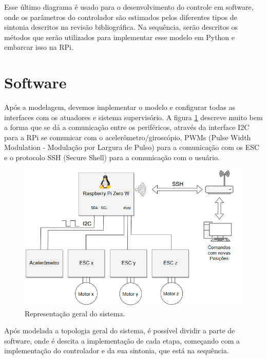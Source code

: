 Esse último diagrama é usado para o desenvolvimento do controle em software, onde os parâmetros do controlador são estimados pelos diferentes tipos de sintonia descritos na revisão bibliográfica. Na sequência, serão descritos os métodos que serão utilizados para implementar esse modelo em Python e embarcar isso na RPi.



\section{Software}

Após a modelagem, devemos implementar o modelo e configurar todas as interfaces com os atuadores e sistema supervisório. A figura \ref{fig:comunicacao_projeto} descreve muito bem a forma que se dá a comunicação entre os periféricos, através da interface I2C para a RPi se comunicar com o acelerômetro/giroscópio, PWMs (Pulse Width Modulation - Modulação por Largura de Pulso) para a comunicação com os ESC e o protocolo SSH (Secure Shell) para a comunicação com o usuário.

\begin{figure}[H]
  \caption{Representação geral do sistema.}
  \begin{center}
      \includegraphics[scale=.65]{metodologia/img/comunicacao_projeto}
  \end{center}
  \label{fig:comunicacao_projeto}
\end{figure}


Após modelada a topologia geral do sistema, é possível dividir a parte de software, onde é descita a implementação de cada etapa, começando com a implementação do controlador e da sua sintonia, que está na sequência.


